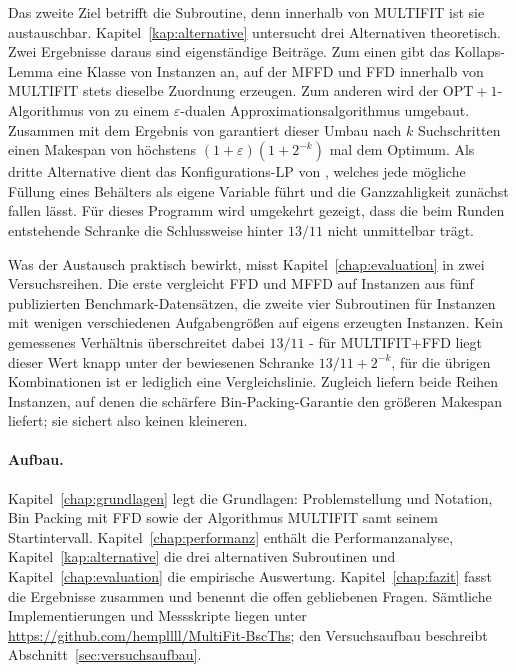Das zweite Ziel betrifft die Subroutine, denn innerhalb von MULTIFIT ist sie austauschbar.
Kapitel~\ref{kap:alternative} untersucht drei Alternativen theoretisch.
Zwei Ergebnisse daraus sind eigenständige Beiträge.
Zum einen gibt das Kollaps-Lemma eine Klasse von Instanzen an, auf der MFFD und FFD innerhalb von
MULTIFIT stets dieselbe Zuordnung erzeugen.
Zum anderen wird der $\mathrm{OPT}+1$-Algorithmus von \textcite{jansen_solisoba2010} zu einem
$\varepsilon$-dualen Approximationsalgorithmus umgebaut.
Zusammen mit dem Ergebnis von \textcite{hochbaum_shmoys_1987} garantiert dieser Umbau nach $k$
Suchschritten einen Makespan von höchstens $(1+\varepsilon)(1+2^{-k})$ mal dem Optimum.
Als dritte Alternative dient das Konfigurations-LP von \textcite{gilmore_gomory1961}, welches
jede mögliche Füllung eines Behälters als eigene Variable führt und die Ganzzahligkeit zunächst
fallen lässt.
Für dieses Programm wird umgekehrt gezeigt, dass die beim Runden entstehende Schranke die
Schlussweise hinter $13/11$ nicht unmittelbar trägt.

Was der Austausch praktisch bewirkt, misst Kapitel~\ref{chap:evaluation} in zwei Versuchsreihen.
Die erste vergleicht FFD und MFFD auf \EvalInstanzen{} Instanzen aus fünf publizierten
Benchmark-Datensätzen, die zweite vier Subroutinen für Instanzen mit wenigen verschiedenen
Aufgabengrößen auf \HmInstanzen{} eigens erzeugten Instanzen.
Kein gemessenes Verhältnis überschreitet dabei $13/11$ - für MULTIFIT+FFD liegt dieser Wert
knapp unter der bewiesenen Schranke $13/11 + 2^{-k}$, für die übrigen Kombinationen ist er
lediglich eine Vergleichslinie.
Zugleich liefern beide Reihen Instanzen, auf denen die schärfere Bin-Packing-Garantie den
größeren Makespan liefert; sie sichert also keinen kleineren.

\paragraph{Aufbau.}
Kapitel~\ref{chap:grundlagen} legt die Grundlagen: Problemstellung und Notation, Bin Packing mit
FFD sowie der Algorithmus MULTIFIT samt seinem Startintervall.
Kapitel~\ref{chap:performanz} enthält die Performanzanalyse, Kapitel~\ref{kap:alternative} die
drei alternativen Subroutinen und Kapitel~\ref{chap:evaluation} die empirische Auswertung.
Kapitel~\ref{chap:fazit} fasst die Ergebnisse zusammen und benennt die offen gebliebenen Fragen.
Sämtliche Implementierungen und Messskripte liegen unter
\url{https://github.com/hempllll/MultiFit-BscThs}; den Versuchsaufbau beschreibt
Abschnitt~\ref{sec:versuchsaufbau}.
